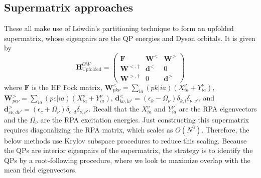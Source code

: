 \subsection{Supermatrix approaches}
These all make use of Löwdin's partitioning technique to form an upfolded supermatrix, whose eigenpairs are the QP energies and Dyson orbitals. It is given by
\begin{equation}
    \bm{H}_{\text{Upfolded}}^{GW} = \begin{pmatrix} \bm{F} & \bm{W}^< & \bm{W}^> \\ \bm{W}^{<,\dagger} & \bm{d}^< & 0 \\ \bm{W}^{>, \dagger} & 0 & \bm{d}^> \end{pmatrix}
\label{eq:booth_hamiltonian}
\end{equation}
where $\bm{F}$ is the HF Fock matrix, $\bm{W}^<_{pk\nu} = \sum_{ia} (pk|ia) \left( X_{ia}^{\nu} + Y_{ia}^{\nu} \right)$, $\bm{W}^>_{pc\nu} = \sum_{ia} (pc|ia) \left( X_{ia}^{\nu} + Y_{ia}^{\nu} \right)$, $\bm{d}^<_{k\nu , l\nu'} = \left(\epsilon_k - \Omega_\nu\right) \delta_{k,l} \delta_{\nu,\nu'}$, and $\bm{d}^>_{c\nu , d\nu'} = \left(\epsilon_c + \Omega_\nu\right) \delta_{c,d} \delta_{\nu,\nu'}$. Recall that the $X_{ia}^{\nu}$ and $Y_{ia}^{\nu}$ are the RPA eigenvectors and the $\Omega_\nu$ are the RPA excitation energies. Just constructing this supermatrix requires diagonalizing the RPA matrix, which scales as $O(N^6)$. Therefore, the below methods use Krylov subspace procedures to reduce this scaling. Because the QPs are interior eigenpairs of the supermatrix, the strategy is to identify the QPs by a root-following procedure, where we look to maximize overlap with the mean field eigenvectors. 
